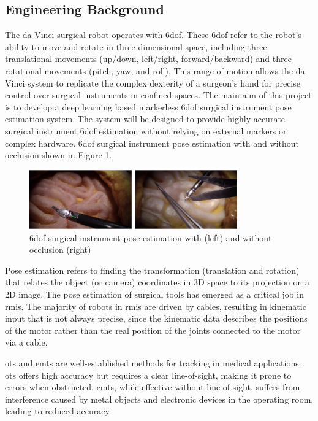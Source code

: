 \documentclass[12pt]{article}
\begin{document}
\subsection{Engineering Background}
The da Vinci surgical robot operates with \gls{6dof}. These \gls{6dof} refer to the robot's ability to move and rotate in three-dimensional space, including three translational movements (up/down, left/right, forward/backward) and three rotational movements (pitch, yaw, and roll)\cite{app9030546}. This range of motion allows the da Vinci system to replicate the complex dexterity of a surgeon's hand for precise control over surgical instruments in confined spaces. The main aim of this project is to develop a deep learning based markerless \gls{6dof} surgical instrument pose estimation system. The system will be designed to provide highly accurate surgical instrument \gls{6dof} estimation without relying on external markers or complex hardware. \gls{6dof} surgical instrument pose estimation with and without occlusion shown in Figure 1\cite{surgripe2024}.

\begin{figure}[H]
            \centering
            \includegraphics[width=0.8\textwidth]{6Dof.png}
            \caption{\gls{6dof} surgical instrument pose estimation with (left) and without occlusion (right)\cite{surgripe2024}}
      \end{figure}



Pose estimation refers to finding the transformation (translation and rotation) that relates the object (or camera) coordinates in 3D space to its projection on a 2D image. The pose estimation of surgical tools has emerged as a critical job in \gls{rmis}. The majority of robots in \gls{rmis} are driven by cables, resulting in kinematic input that is not always precise, since the kinematic data describes the positions of the motor rather than the real position of the joints connected to the motor via a cable\cite{10160287}. 

\gls{ots} and \gls{emts} are well-established methods for tracking in medical applications. \gls{ots} offers high accuracy but requires a clear line-of-sight, making it prone to errors when obstructed. \gls{emts}, while effective without line-of-sight, suffers from interference caused by metal objects and electronic devices in the operating room, leading to reduced accuracy\cite{8822749}.
\end{document}
